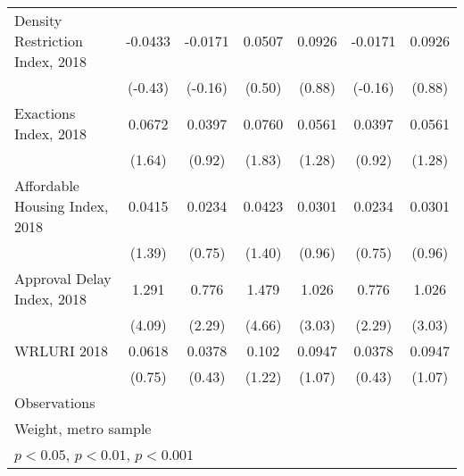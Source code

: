 \begin{table}[htbp]
\begin{tabular}{l*{6}{c}}
Density Restriction Index, 2018&     -0.0433         &     -0.0171         &      0.0507         &      0.0926         &     -0.0171         &      0.0926         \\
                    &     (-0.43)         &     (-0.16)         &      (0.50)         &      (0.88)         &     (-0.16)         &      (0.88)         \\
\addlinespace
Exactions Index, 2018&      0.0672         &      0.0397         &      0.0760         &      0.0561         &      0.0397         &      0.0561         \\
                    &      (1.64)         &      (0.92)         &      (1.83)         &      (1.28)         &      (0.92)         &      (1.28)         \\
\addlinespace
Affordable Housing Index, 2018&      0.0415         &      0.0234         &      0.0423         &      0.0301         &      0.0234         &      0.0301         \\
                    &      (1.39)         &      (0.75)         &      (1.40)         &      (0.96)         &      (0.75)         &      (0.96)         \\
\addlinespace
Approval Delay Index, 2018&       1.291\sym{***}&       0.776\sym{*}  &       1.479\sym{***}&       1.026\sym{**} &       0.776\sym{*}  &       1.026\sym{**} \\
                    &      (4.09)         &      (2.29)         &      (4.66)         &      (3.03)         &      (2.29)         &      (3.03)         \\
\addlinespace
WRLURI 2018         &      0.0618         &      0.0378         &       0.102         &      0.0947         &      0.0378         &      0.0947         \\
                    &      (0.75)         &      (0.43)         &      (1.22)         &      (1.07)         &      (0.43)         &      (1.07)         \\
\midrule
Observations        &                     &                     &                     &                     &                     &                     \\
\bottomrule
\multicolumn{7}{l}{\footnotesize Weight, metro sample}\\
\multicolumn{7}{l}{\footnotesize \sym{*} \(p<0.05\), \sym{**} \(p<0.01\), \sym{***} \(p<0.001\)}\\
\end{tabular}
\end{table}

